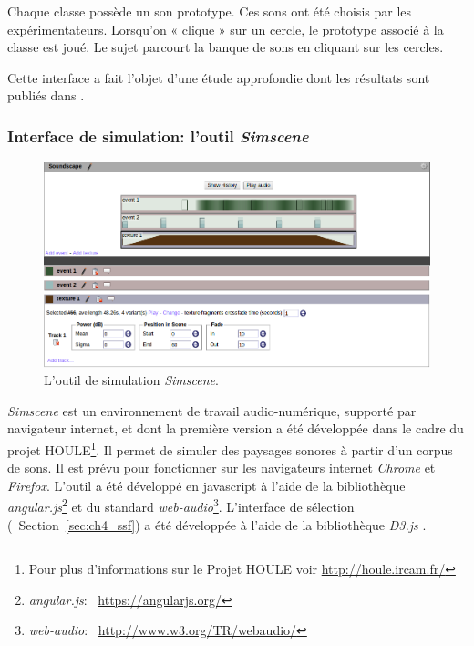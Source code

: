 Chaque classe possède un son prototype. Ces sons ont été choisis par les expérimentateurs. Lorsqu’on « clique » sur un cercle, le prototype associé à la classe est joué. Le sujet parcourt la banque de sons en cliquant sur les cercles.

Cette interface a fait l'objet d'une étude approfondie dont les résultats sont publiés dans \citep{lafay2016JAES}. \\


\subsubsection{Interface de simulation: l'outil \emph{Simscene}}
\label{sec:ch4_simscene}

\begin{figure}[t]
        \myfloatalign
        \includegraphics[width=\linewidth]{gfx/ch_4/simscene}
       \caption{L'outil de simulation \emph{Simscene}.}\label{fig:simscene}
\end{figure}

\emph{Simscene} est un environnement de travail audio-numérique, supporté par navigateur internet, et dont la première version a été développée dans le cadre du projet HOULE\footnote{Pour plus d’informations sur le Projet HOULE voir \url{http://houle.ircam.fr/}}. Il permet de simuler des paysages sonores à partir d'un corpus de sons. Il est prévu pour fonctionner sur les navigateurs internet \emph{Chrome} et \emph{Firefox}. L'outil a été développé en javascript à l'aide de la bibliothèque \emph{angular.js}\footnote{\emph{angular.js}: \cf~\url{https://angularjs.org/}} et du standard \emph{web-audio}\footnote{\emph{web-audio}: \cf~\url{http://www.w3.org/TR/webaudio/}}. L'interface de sélection (\cf~Section~\ref{sec:ch4_ssf}) a été développée à l'aide de la bibliothèque \emph{D3.js} \citep{d32011}.

